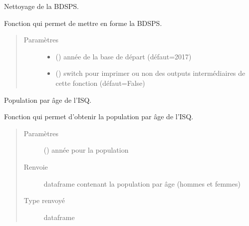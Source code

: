 \documentclass[letterpaper,10pt,french]{sphinxmanual}
\begin{document}
\begin{fulllineitems}
\label{\detokenize{code:simgen.bdsps}}
Nettoyage de la BDSPS.

Fonction qui permet de mettre en forme la BDSPS.
\begin{quote}\begin{description}
\item[{Paramètres}] \leavevmode\begin{itemize}
\item {} 
 () \textendash{} année de la base de départ (défaut=2017)

\item {} 
 () \textendash{} switch pour imprimer ou non des outputs intermédiaires de cette fonction (défaut=False)

\end{itemize}

\end{description}\end{quote}

\end{fulllineitems}


\begin{fulllineitems}
\label{\detokenize{code:simgen.isq}}
Population par âge de l’ISQ.

Fonction qui permet d’obtenir la population par âge de l’ISQ.
\begin{quote}\begin{description}
\item[{Paramètres}] \leavevmode
{} () \textendash{} année pour la population

\item[{Renvoie}] \leavevmode
dataframe  contenant la population par âge (hommes et femmes)

\item[{Type renvoyé}] \leavevmode
dataframe

\end{description}\end{quote}

\end{fulllineitems}
\end{document}
